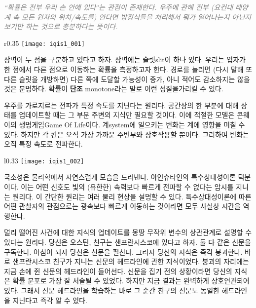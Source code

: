 \documentclass[a4paper,chapter,kosection,atbegshi,hidelinks,itemph]{oblivoir}
\begin{document}
\newpage\pagestyle{hf}

\hfill\parbox[t]{9cm}{\textcolor{gray}{\slshape``확률은 전부 우리 손 안에 있다"는
관점이 존재한다. 우주에 관해 전부 (요컨대 태양계 속 모든 원자의 
위치/속도를) 안다면 방정식들을 처리해서 뭐가 일어나는지 아닌지
보기만 하는 것으로 충분하다는 뜻이다.}}\break

\begin{wrapfigure}{r}{0.35\textwidth}
    \centering
    \texttt{[image: iqis1\_001]}
\end{wrapfigure}

\hfill

장벽이 두 점을 구분하고 있다고 하자. 장벽에는 슬릿{\footnotesize slit}이 하나
있다. 우리는 입자가 한 점에서 다른 점으로 이동하는 확률을 측정하고자 한다. 
경로를 늘리면 (다시 말해 또 다른 슬릿을 개방하면) 다른 쪽에 도달할 가능성이 증가, 아니 적어도 감소하지는 않을 것은 분명하다. 확률이 \textbf{단조}{\footnotesize
monotone}라는 말로 이런 성질을가리킬 수 있다.

\hfill
\begin{description}[leftmargin=0cm]
    \item[국소성{\footnotesize Locality}.] 
        우주를 가로지르는 전파가 특정 속도를 지닌다는 원리다.
        공간상의 한 부분에 대해 상태를 업데이트할 때는 그 부분 주변의 지식만
        필요할 것이다. 이에 적절한 모델은 콘웨이의 생명게임{\footnotesize Game Of
        Life}이다. 계{\footnotesize system}에 일으키는 변화는 계에 영향을 미칠
        수 있다. 하지만 각 칸은 오직 가장 가까운 주변부와 상호작용할 뿐이다. 
        그리하여 변화는 오직 특정 속도로 전파한다.
\end{description}

\begin{wrapfigure}{l}{0.33\textwidth}
    \centering
    \texttt{[image: iqis1\_002]}
\end{wrapfigure}

\hfill

국소성은 물리학에서 자연스럽게 모습을 드러낸다. 아인슈타인의 특수상대성이론
덕분이다. 이는 어떤 신호도 빛의 (유한한) 속력보다 빠르게 전파할 수 없다는
암시를 지니는 원리다. 이 간단한 원리는 여러 물리 현상을 설명할 수 있다. 
특수상대성이론에 따른 어떤 관찰자의 관점으로는 광속보다 빠르게 이동하는 것이라면
모두 사실상 시간을 역행한다.\break

\begin{description}[leftmargin=0cm]
    \item[국소적 실재론{\footnotesize Local Realism}.] 멀리 떨어진 사건에 대한
        지식의 업데이트를 몽땅 무작위 변수의 상관관계로 설명할 수 있다는
        원리다. 당신은 오스틴, 친구는 샌프란시스코에 있다고 하자. 둘 다
        같은 신문을 구독한다. 아침이 되자 당신은 신문을 펼친다. 그러자 당신의
        지식은 즉각 붕괴한다. 바로 샌프란시스코 친구가 지니는 신문의 헤드라인에
        관한 지식이었다. 붕괴의 자리에는 지금 손에 쥔 신문의 헤드라인이 들어선다.
        신문을 집기 전의 상황이라면 당신의 지식은 확률 분포로 가장 잘 서술될 수
        있었다. 하지만 지금 결과는 완벽하게 상호연관되어 있다. 그래서 신문
        헤드라인을 학습하는 바로 그 순간 친구의 신문도 동일한 헤드라인을
        지닌다고 즉각 알 수 있다.
        \end{description}
\end{document}

